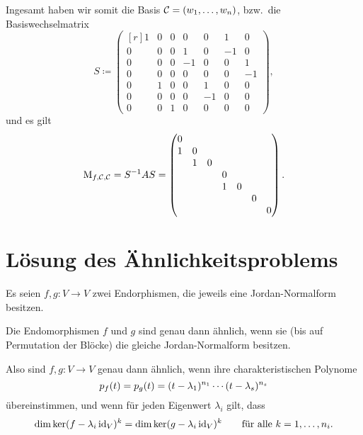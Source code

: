 \begin{example}
  Ingesamt haben wir somit die Basis $\mathcal{C} = (w_1, \dotsc, w_n)$, bzw.\ die Basiswechselmatrix
  \[
              S
    \coloneqq \begin{pmatrix*}[r]
                1 & 0 & 0 &  0  &  0  &  1  &  0  \\
                0 & 0 & 0 &  1  &  0  & -1  &  0  \\
                0 & 0 & 0 & -1  &  0  &  0  &  1  \\
                0 & 0 & 0 &  0  &  0  &  0  & -1  \\
                0 & 1 & 0 &  0  &  1  &  0  &  0  \\
                0 & 0 & 0 &  0  & -1  &  0  &  0  \\
                0 & 0 & 1 &  0  &  0  &  0  &  0
              \end{pmatrix*},
  \]
  und es gilt
  \[
      \operatorname{M}_{f, \mathcal{C}, \mathcal{C}}
    = S^{-1} A S
    = \begin{pmatrix}
        0 &   &   &   &   &   &   \\
        1 & 0 &   &   &   &   &   \\
          & 1 & 0 &   &   &   &   \\
          &   &   & 0 &   &   &   \\
          &   &   & 1 & 0 &   &   \\
          &   &   &   &   & 0 &   \\
          &   &   &   &   &   & 0
      \end{pmatrix}.
  \]
\end{example}





\section{Lösung des Ähnlichkeitsproblems}

Es seien $f, g \colon V \to V$ zwei Endorphismen, die jeweils eine Jordan-Normalform besitzen.

\begin{theorem}
  Die Endomorphismen $f$ und $g$ sind genau dann ähnlich, wenn sie (bis auf Permutation der Blöcke) die gleiche Jordan-Normalform besitzen.
\end{theorem}

Also sind $f, g \colon V \to V$ genau dann ähnlich, wenn ihre charakteristischen Polynome
\[
    p_{f}(t)
  = p_{g}(t)
  = (t - \lambda_1)^{n_1} \dotsm (t - \lambda_s)^{n_s}
\]
übereinstimmen, und wenn für jeden Eigenwert $\lambda_i$ gilt, dass
\[
    \dim \ker (f - \lambda_i \operatorname{id}_V)^k
  = \dim \ker (g - \lambda_i \operatorname{id}_V)^k
  \qquad
  \text{für alle $k = 1, \dotsc, n_i$}.
\]

